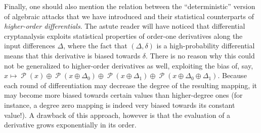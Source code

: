 \documentclass[11pt,a4paper]{article}
\theoremstyle{definition}
\theoremstyle{theorem}
\DeclareMathOperator\Perm{\mathcal{P}}
\begin{document}
Finally, one should also mention the relation between the ``deterministic'' version of algebraic attacks that we have introduced
and their statistical counterparts of \emph{higher-order differentials}. The astute reader will have noticed that differential
cryptanalysis exploits statistical properties of order-one derivatives along the input differences $\Delta$, where
the fact that $(\Delta,\delta)$ is a high-probability differential means that this derivative is biased towards
$\delta$. There is no
reason why this could not be generalized to higher-order derivatives as well, exploiting the bias of, say,
$x \mapsto \Perm(x) \oplus \Perm(x \oplus \Delta_0) \oplus \Perm(x \oplus \Delta_1) \oplus \Perm(x \oplus \Delta_0 \oplus \Delta_1)$.
Because each round of differentiation may decrease the degree of the resulting mapping, it may become more biased towards
certain values than higher-degree ones (for instance, a degree zero mapping is indeed very biased towards its constant value!).
A drawback of this approach, however is that the evaluation of a derivative grows exponentially in its order. 



\end{document}

